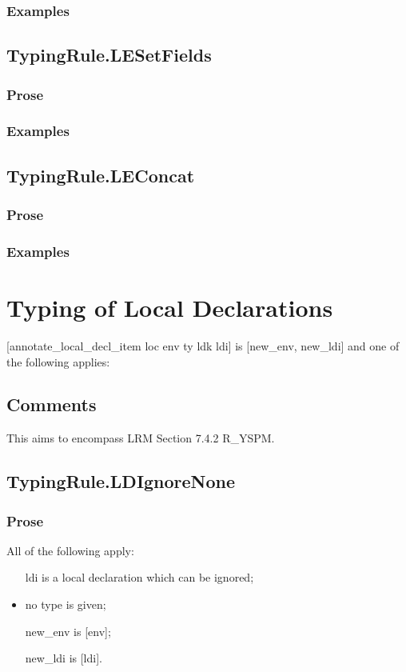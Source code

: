 \documentclass{book}
\begin{document}
    \subsubsection{Examples}

\subsection{TypingRule.LESetFields}

    \subsubsection{Prose}

    \subsubsection{Examples}

\subsection{TypingRule.LEConcat}
    \subsubsection{Prose}
    

    \subsubsection{Examples}



\section{
Typing of Local Declarations
}
[annotate\_local\_decl\_item loc env ty ldk ldi] is [new\_env, new\_ldi] and one
of the following applies:

\subsection{Comments}
  This aims to encompass LRM Section 7.4.2 R\_YSPM.

\subsection{TypingRule.LDIgnoreNone}

    \subsubsection{Prose}
    All of the following apply:
   \begin{itemize}
   \item [ldi] is a local declaration which can be ignored;
   \item no type is given;
   \item [new\_env] is [env];
   \item [new\_ldi] is [ldi].
   \end{itemize}
\end{document}
